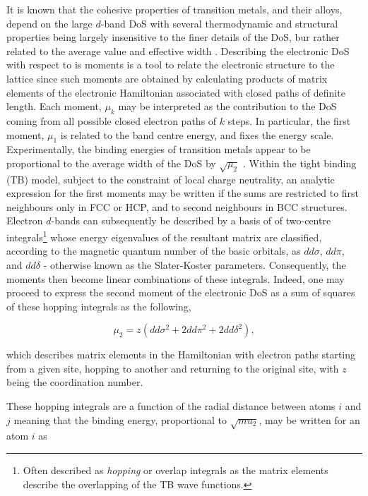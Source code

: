 It is known that the cohesive properties of transition metals, and their alloys, depend on the large $d$-band DoS with several thermodynamic and structural properties being largely insensitive to the finer details of the DoS, bur rather related to the average value and effective width \cite{refId0}. Describing the electronic DoS with respect to is moments is a tool to relate the electronic structure to the lattice since such moments are obtained by calculating products of matrix elements of the electronic Hamiltonian associated with closed paths of definite length. Each moment, $\mu_{k}$ may be interpreted as the contribution to the DoS coming from all possible closed electron paths of $k$ steps. In particular, the first moment, $\mu_{1}$ is related to the band centre energy, and fixes the energy scale. Experimentally, the binding energies of transition metals appear to be proportional to the average width of the DoS by $\sqrt{\mu_{2}}$ \cite{ALLAN1979142}. Within the tight binding (TB) model, subject to the constraint of local charge neutrality, an analytic expression for the first moments may be written if the sums are restricted to first neighbours only in FCC or HCP, and to second neighbours in BCC structures. Electron $d$-bands can subsequently be described by a basis of of two-centre integrals\footnote{Often described as \textit{hopping} or overlap integrals as the matrix elements describe the overlapping of the TB wave functions.} whose energy eigenvalues of the resultant matrix are classified, according to the magnetic quantum number of the basic orbitals, as $dd\sigma$, $dd\pi$, and $dd\delta$ - otherwise known as the Slater-Koster parameters\cite{PhysRev.94.1498}. Consequently, the moments then become linear combinations of these integrals. Indeed, one may proceed to express the second moment of the electronic DoS as a sum of squares of these hopping integrals as the following,

\begin{equation}
    \mu_{2} = z \left( dd\sigma^{2} + 2dd\pi^{2} + 2dd\delta^{2}\right),
    \label{eqn:mu2}
\end{equation}

 which describes matrix elements in the Hamiltonian with electron paths starting from a given site, hopping to another and returning to the original site, with $z$ being the coordination number.

These hopping integrals are a function of the radial distance between atoms $i$ and $j$ meaning that the binding energy, proportional to $\sqrt{mu_{2}}$, may be written for an atom $i$ as

